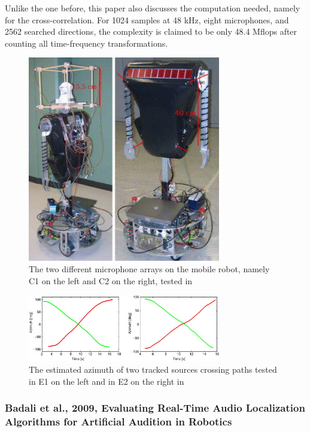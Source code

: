 \documentclass[notitlepage]{report}
\begin{document}
Unlike the one before, this paper also discusses the computation needed, namely for the cross-correlation. For 1024 samples at 48 \si{kHz}, eight microphones, and 2562 searched directions, the complexity is claimed to be only 48.4 \si{Mflops} after counting all time-frequency transformations.

\begin{figure}[H]
\includegraphics[width=0.75\textwidth]{./valin_2007/array.jpg}
\centering
\caption{The two different microphone arrays on the mobile robot, namely C1 on the left and C2 on the right, tested in \cite{valin_robust_2007}}
\label{fig:valin_2007_array}
\centering
\end{figure}

\begin{figure}[H]
\includegraphics[width=0.75\textwidth]{./valin_2007/track.jpg}
\centering
\caption{The estimated azimuth of two tracked sources crossing paths tested in E1 on the left and in E2 on the right in \cite{valin_robust_2007}}
\label{fig:valin_2007_track}
\centering
\end{figure}

\subsubsection{Badali et al., 2009, Evaluating Real-Time Audio Localization Algorithms for Artificial Audition in Robotics}
\end{document}
